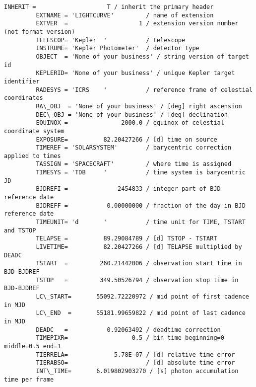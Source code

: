 \documentclass[11pt]{article}
\begin{document}
\begin{Verbatim}[commandchars=\\\{\}]
         INHERIT =                    T / inherit the primary header                     
         EXTNAME = 'LIGHTCURVE'         / name of extension                              
         EXTVER  =                    1 / extension version number (not format version)  
         TELESCOP= 'Kepler  '           / telescope                                      
         INSTRUME= 'Kepler Photometer'  / detector type                                  
         OBJECT  = 'None of your business' / string version of target id                 
         KEPLERID= 'None of your business' / unique Kepler target identifier             
         RADESYS = 'ICRS    '           / reference frame of celestial coordinates       
         RA\_OBJ  = 'None of your business' / [deg] right ascension                       
         DEC\_OBJ = 'None of your business' / [deg] declination                           
         EQUINOX =               2000.0 / equinox of celestial coordinate system         
         EXPOSURE=          82.20427266 / [d] time on source                             
         TIMEREF = 'SOLARSYSTEM'        / barycentric correction applied to times        
         TASSIGN = 'SPACECRAFT'         / where time is assigned                         
         TIMESYS = 'TDB     '           / time system is barycentric JD                  
         BJDREFI =              2454833 / integer part of BJD reference date             
         BJDREFF =           0.00000000 / fraction of the day in BJD reference date      
         TIMEUNIT= 'd       '           / time unit for TIME, TSTART and TSTOP           
         TELAPSE =          89.29084789 / [d] TSTOP - TSTART                             
         LIVETIME=          82.20427266 / [d] TELAPSE multiplied by DEADC                
         TSTART  =         260.21442006 / observation start time in BJD-BJDREF           
         TSTOP   =         349.50526794 / observation stop time in BJD-BJDREF            
         LC\_START=       55092.72220972 / mid point of first cadence in MJD              
         LC\_END  =       55181.99659822 / mid point of last cadence in MJD               
         DEADC   =           0.92063492 / deadtime correction                            
         TIMEPIXR=                  0.5 / bin time beginning=0 middle=0.5 end=1          
         TIERRELA=             5.78E-07 / [d] relative time error                        
         TIERABSO=                      / [d] absolute time error                        
         INT\_TIME=       6.019802903270 / [s] photon accumulation time per frame         

\end{Verbatim}
\end{document}
